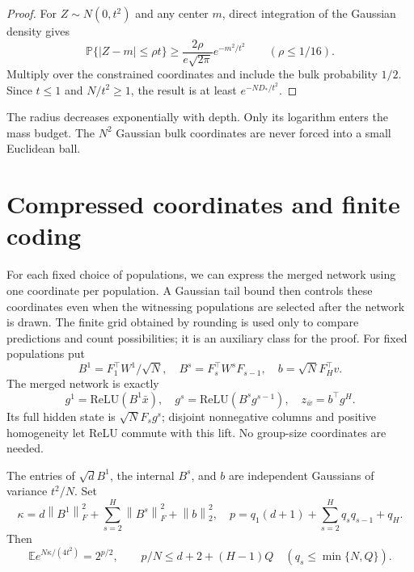 \documentclass[11pt]{article}
\newcommand{\E}{\mathbb E}\newcommand{\Prb}{\mathbb P}
\newcommand{\norm}[1]{\left\|#1\right\|}
\newcommand{\relu}{\mathrm{ReLU}}
\begin{document}
\begin{proof}
For $Z\sim N(0,t^2)$ and any center $m$, direct integration of the Gaussian density gives
\[
 \Prb\{|Z-m|\le\rho t\}\ge\frac{2\rho}{e\sqrt{2\pi}}e^{-m^2/t^2}
 \qquad(\rho\le1/16).
\]
Multiply over the constrained coordinates and include the bulk probability $1/2$. Since $t\le1$ and $N/t^2\ge1$, the result is at least $e^{-ND_*/t^2}$.
\end{proof}
The radius decreases exponentially with depth. Only its logarithm enters the mass budget. The $N^2$ Gaussian bulk coordinates are never forced into a small Euclidean ball.

\section{Compressed coordinates and finite coding}
For each fixed choice of populations, we can express the merged network using one coordinate per population. A Gaussian tail bound then controls these coordinates even when the witnessing populations are selected after the network is drawn. The finite grid obtained by rounding is used only to compare predictions and count possibilities; it is an auxiliary class for the proof.
For fixed populations put
\[
 B^1=F_1^\top W^1/\sqrt N,\quad B^s=F_s^\top W^sF_{s-1},\quad b=\sqrt N F_H^\top v.
\]
The merged network is exactly
\[
 g^1=\relu(B^1\bar x),\quad g^s=\relu(B^sg^{s-1}),\quad z_{\bar w}=b^\top g^H.
\]
Its full hidden state is $\sqrt N F_sg^s$; disjoint nonnegative columns and positive homogeneity let ReLU commute with this lift. No group-size coordinates are needed.

The entries of $\sqrt dB^1$, the internal $B^s$, and $b$ are independent Gaussians of variance $t^2/N$. Set
\[
 \kappa=d\norm{B^1}_F^2+\sum_{s=2}^H\norm{B^s}_F^2+\norm b_2^2,
 \quad p=q_1(d+1)+\sum_{s=2}^Hq_sq_{s-1}+q_H.
\]
Then
\begin{equation}\label{eq:mgf}
 \E e^{N\kappa/(4t^2)}=2^{p/2},\qquad
 p/N\le d+2+(H-1)Q\quad(q_s\le\min\{N,Q\}).
\end{equation}
\end{document}
